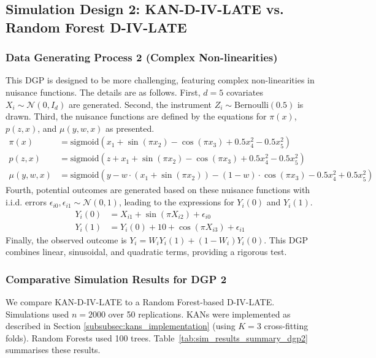 \documentclass[final,3p,fleqn, 10pt]{elsarticle}
\begin{document}
\subsection{Simulation Design 2: KAN-D-IV-LATE vs. Random Forest D-IV-LATE}
\label{subsec:sim_dgp2}

\subsubsection{Data Generating Process 2 (Complex Non-linearities)}
This DGP is designed to be more challenging, featuring complex non-linearities in nuisance functions. The details are as follows.
First, $d=5$ covariates $X_i \sim \mathcal{N}(0, I_d)$ are generated. Second, the instrument $Z_i \sim \text{Bernoulli}(0.5)$ is drawn. Third, the nuisance functions are defined by the equations for $\pi(x)$, $p(z, x)$, and $\mu(y, w, x)$ as presented.
        \begin{align*}
        \pi(x) &= \text{sigmoid}(x_1 + \sin(\pi x_2) - \cos(\pi x_3) + 0.5x_4^2 - 0.5x_5^2) \\
        p(z, x) &= \text{sigmoid}(z + x_1 + \sin(\pi x_2) - \cos(\pi x_3) + 0.5x_4^2 - 0.5x_5^2) \\
        \mu(y, w, x) &= \text{sigmoid}(y - w \cdot (x_1 + \sin(\pi x_2)) - (1-w) \cdot \cos(\pi x_3) - 0.5x_4^2 + 0.5x_5^2)
        \end{align*}
Fourth, potential outcomes are generated based on these nuisance functions with i.i.d. errors $\epsilon_{i0}, \epsilon_{i1} \sim \mathcal{N}(0,1)$, leading to the expressions for $Y_i(0)$ and $Y_i(1)$.
        \begin{align*}
        Y_i(0) &= X_{i1} + \sin(\pi X_{i2}) + \epsilon_{i0} \\
        Y_i(1) &= Y_i(0) + 10 + \cos(\pi X_{i3}) + \epsilon_{i1}
        \end{align*}
Finally, the observed outcome is $Y_i = W_i Y_i(1) + (1-W_i) Y_i(0)$.
This DGP combines linear, sinusoidal, and quadratic terms, providing a rigorous test.

\subsubsection{Comparative Simulation Results for DGP 2}
We compare KAN-D-IV-LATE to a Random Forest-based D-IV-LATE. Simulations used $n=2000$ over 50 replications. KANs were implemented as described in Section \ref{subsubsec:kans_implementation} (using $K=3$ cross-fitting folds). Random Forests used 100 trees. Table~\ref{tab:sim_results_summary_dgp2} summarises these results.
\end{document}
